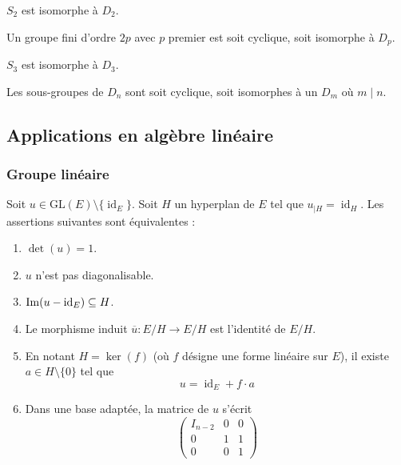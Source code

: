 
  \begin{example}
    $S_2$ est isomorphe à $D_2$.
  \end{example}


  \begin{proposition}
    Un groupe fini d'ordre $2p$ avec $p$ premier est soit cyclique, soit isomorphe à $D_p$.
  \end{proposition}

  \begin{example}
    $S_3$ est isomorphe à $D_3$.
  \end{example}


  \begin{proposition}
    Les sous-groupes de $D_n$ sont soit cyclique, soit isomorphes à un $D_m$ où $m \mid n$.
  \end{proposition}

  \subsection{Applications en algèbre linéaire}

  \subsubsection{Groupe linéaire}


  \begin{proposition}
    Soit $u \in \mathrm{GL}(E) \setminus \{ \operatorname{id}_E \}$. Soit $H$ un hyperplan de $E$ tel que $u_{|H} = \operatorname{id}_H$. Les assertions suivantes sont équivalentes :
    \begin{enumerate}[label=(\roman*)]
      \item $\det(u) = 1$.
      \item $u$ n'est pas diagonalisable.
      \item $\mathrm{Im}(u - \operatorname{id}_E) \subseteq H$.
      \item Le morphisme induit $\overline{u} : E/H \rightarrow E/H$ est l'identité de $E/H$.
      \item En notant $H = \ker(f)$ (où $f$ désigne une forme linéaire sur $E$), il existe $a \in H \setminus \{ 0 \}$ tel que
      \[ u = \operatorname{id}_E + f \cdot a \]
      \item Dans une base adaptée, la matrice de $u$ s'écrit
      \[
      \begin{pmatrix}
        I_{n-2} & 0 & 0 \\
        0 & 1 & 1 \\
        0 & 0 & 1
      \end{pmatrix}
      \]
    \end{enumerate}
  \end{proposition}

